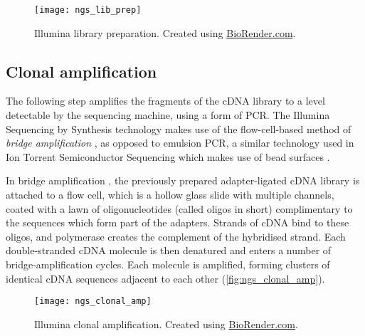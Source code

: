 

\begin{figure}[!h]
    \centering
    \texttt{[image: ngs\_lib\_prep]}
    \caption[Library preparation]{Illumina library preparation. Created using \href{https://biorender.com/}{BioRender.com}. } 
    \label{fig:ngs_lib_prep}
\end{figure}

\subsection{Clonal amplification}
The following step amplifies the fragments of the cDNA library to a level detectable by the sequencing machine, using a form of \ac{PCR}. The Illumina Sequencing by Synthesis technology makes use of the flow-cell-based method of \textit{bridge amplification} \citep{illumina2010}, as opposed to emulsion PCR, a similar technology used in Ion Torrent Semiconductor Sequencing which makes use of bead surfaces \citep{williams2006amplification}.

In bridge amplification \citep{illumina2010}, the previously prepared adapter-ligated cDNA library is attached to a flow cell, which is a hollow glass slide with multiple channels, coated with a lawn of oligonucleotides (called oligos in short) complimentary to the sequences which form part of the adapters. Strands of cDNA bind to these oligos, and polymerase creates the complement of the hybridised strand. Each double-stranded cDNA molecule is then denatured and enters a number of bridge-amplification cycles. Each molecule is amplified, forming clusters of identical cDNA sequences adjacent to each other (\autoref{fig:ngs_clonal_amp}).

\begin{figure}[!h]
    \centering
    \texttt{[image: ngs\_clonal\_amp]}
    \caption[Illumina clonal amplification]{Illumina clonal amplification. Created using \href{https://biorender.com/}{BioRender.com}. } 
    \label{fig:ngs_clonal_amp}
\end{figure}

